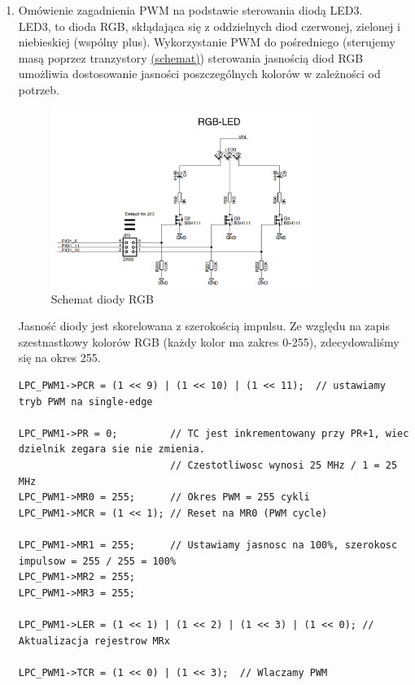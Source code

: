 \begin{enumerate}
    \item Omówienie zagadnienia PWM na podstawie sterowania diodą LED3. \\
        LED3, to dioda RGB, skłądająca się z oddzielnych diod czerwonej, zielonej i niebieskiej (wspólny plus). Wykorzystanie PWM do pośredniego (sterujemy masą poprzez tranzystory \hyperref[fig:led3]{(schemat)}) sterowania jasnością diod RGB umożliwia dostosowanie jasności poszczególnych kolorów w zależności od potrzeb.
        \begin{figure}[H]
            \centering
            \includegraphics[width=0.8\textwidth]{../PWM/led3.jpg}
            \caption{Schemat diody RGB}
            \label{fig:led3}
        \end{figure}
        
        Jasność diody jest skorelowana z szerokością impulsu. Ze względu na zapis szestnastkowy kolorów RGB (każdy kolor ma zakres 0-255), zdecydowaliśmy się na okres 255.
        \begin{lstlisting}
LPC_PWM1->PCR = (1 << 9) | (1 << 10) | (1 << 11);  // ustawiamy tryb PWM na single-edge

LPC_PWM1->PR = 0;         // TC jest inkrementowany przy PR+1, wiec dzielnik zegara sie nie zmienia. 
                          // Czestotliwosc wynosi 25 MHz / 1 = 25 MHz
LPC_PWM1->MR0 = 255;      // Okres PWM = 255 cykli 
LPC_PWM1->MCR = (1 << 1); // Reset na MR0 (PWM cycle)

LPC_PWM1->MR1 = 255;      // Ustawiamy jasnosc na 100%, szerokosc impulsow = 255 / 255 = 100%
LPC_PWM1->MR2 = 255;      
LPC_PWM1->MR3 = 255; 

LPC_PWM1->LER = (1 << 1) | (1 << 2) | (1 << 3) | (1 << 0); // Aktualizacja rejestrow MRx

LPC_PWM1->TCR = (1 << 0) | (1 << 3);  // Wlaczamy PWM
        \end{lstlisting}


\end{enumerate}

